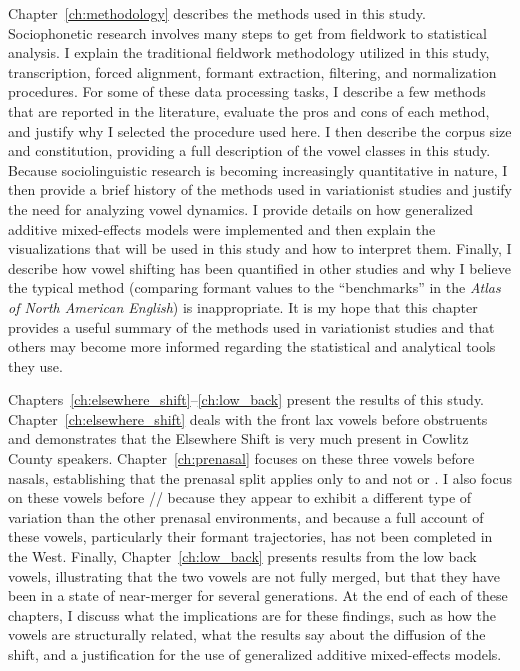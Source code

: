 Chapter~\ref{ch:methodology} describes the methods used in this study. Sociophonetic research involves many steps to get from fieldwork to statistical analysis. I explain the traditional fieldwork methodology utilized in this study, transcription, forced alignment, formant extraction, filtering, and normalization procedures. For some of these data processing tasks, I describe a few methods that are reported in the literature, evaluate the pros and cons of each method, and justify why I selected the procedure used here. I then describe the corpus size and constitution, providing a full description of the vowel classes in this study. Because sociolinguistic research is becoming increasingly quantitative in nature, I then provide a brief history of the methods used in variationist studies and justify the need for analyzing vowel dynamics. I provide details on how generalized additive mixed-effects models were implemented and then explain the visualizations that will be used in this study and how to interpret them. Finally, I describe how vowel shifting has been quantified in other studies and why I believe the typical method (comparing formant values to the ``benchmarks'' in the \textit{Atlas of North American English}) is inappropriate. It is my hope that this chapter provides a useful summary of the methods used in variationist studies and that others may become more informed regarding the statistical and analytical tools they use.

Chapters~\ref{ch:elsewhere_shift}--\ref{ch:low_back} present the results of this study. Chapter~\ref{ch:elsewhere_shift} deals with the front lax vowels before obstruents and demonstrates that the Elsewhere Shift is very much present in Cowlitz County speakers. Chapter~\ref{ch:prenasal} focuses on these three vowels before nasals, establishing that the prenasal split applies only to \trap and not \dress or \kit. I also focus on these vowels before // because they appear to exhibit a different type of variation than the other prenasal environments, and because a full account of these vowels, particularly their formant trajectories, has not been completed in the West. Finally, Chapter~\ref{ch:low_back} presents results from the low back vowels, illustrating that the two vowels are not fully merged, but that they have been in a state of near-merger for several generations. At the end of each of these chapters, I discuss what the implications are for these findings, such as how the vowels are structurally related, what the results say about the diffusion of the shift, and a justification for the use of generalized additive mixed-effects models.


